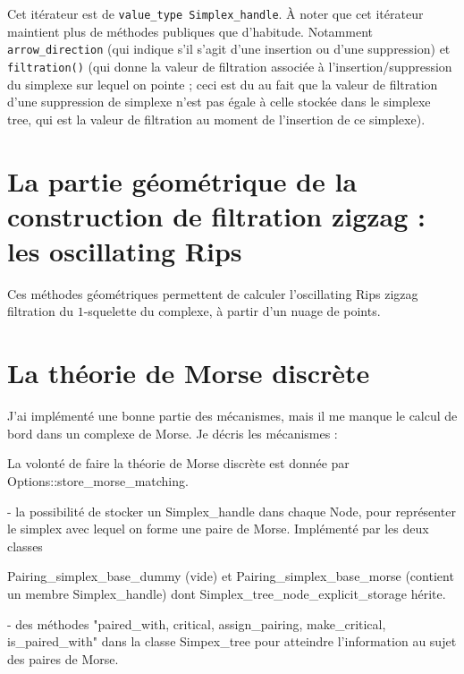 \documentclass[11pt]{amsart}
\numberwithin{equation}{section}
\theoremstyle{plain}
\theoremstyle{definition}
\newcommand{\clem}[1]{ \color{red}{#1} \color{black}{}}
\begin{document}
\begin{itemize}
\begin{itemize}
\smallskip

Cet itérateur est de {\tt value\_type Simplex\_handle}. À noter que cet itérateur maintient plus de méthodes publiques que d'habitude. Notamment {\tt arrow\_direction} (qui indique s'il s'agit d'une insertion ou d'une suppression) et {\tt filtration()} (qui donne la valeur de filtration associée à l'insertion/suppression du simplexe sur lequel on pointe ; ceci est du au fait que la valeur de filtration d'une suppression de simplexe n'est pas égale à celle stockée dans le simplexe tree, qui est la valeur de filtration au moment de l'insertion de ce simplexe).

\end{itemize}







\section{La partie géométrique de la construction de filtration zigzag : les oscillating Rips}

Ces méthodes géométriques permettent de calculer l'oscillating Rips zigzag filtration du $1$-squelette du complexe, à partir d'un nuage de points.

\clem{continuer}




\section{La théorie de Morse discrète}

J'ai implémenté une bonne partie des mécanismes, mais il me manque le calcul de bord dans un complexe de Morse. Je décris les mécanismes :

La volonté de faire la théorie de Morse discrète est donnée par Options::store\_morse\_matching.

- la possibilité de stocker un Simplex\_handle dans chaque Node, pour représenter le simplex avec lequel on forme une paire de Morse. Implémenté par les deux classes 

Pairing\_simplex\_base\_dummy (vide) et Pairing\_simplex\_base\_morse (contient un membre Simplex\_handle) dont Simplex\_tree\_node\_explicit\_storage hérite.

- des méthodes "paired\_with, critical, assign\_pairing, make\_critical, is\_paired\_with" dans la classe Simpex\_tree pour atteindre l'information au sujet des paires de Morse.


\end{itemize}
\end{document}
